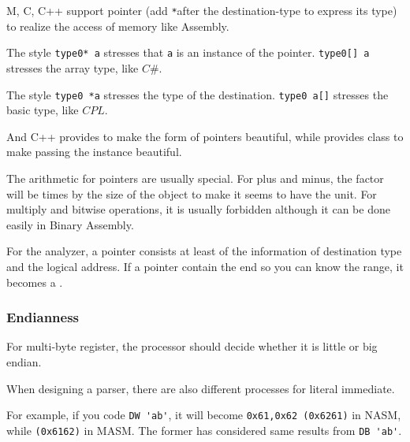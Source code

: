 M, C, C++ support pointer (add \verb`*`after the destination-type to express its type) to realize the access of memory like Assembly.

The style \verb|type0* a| stresses that \verb|a| is an instance of the pointer. \verb|type0[] a| stresses the array type, like $C\#$.

The style \verb|type0 *a| stresses the type of the destination. \verb|type0 a[]| stresses the basic type, like $CPL$.

And C++ provides  to make the form of pointers beautiful, while provides class to make passing the instance beautiful.

The arithmetic for pointers are usually special. For plus and minus, the factor will be times by the size of the object to make it seems to have the unit. For multiply and bitwise operations, it is usually forbidden although it can be done easily in Binary Assembly. 

For the analyzer, a pointer consists at least of the information of destination type and the logical address.
If a pointer contain the end so you can know the range, it becomes a .

\subsubsection{Endianness}

For multi-byte register, the processor should decide whether it is little or big endian.

When designing a parser, there are also different processes for literal immediate.

For example, if you code \verb|DW 'ab'|, it will become \verb"0x61,0x62 (0x6261)" in NASM, while \verb"(0x6162)" in MASM. The former has considered same results from \verb|DB 'ab'|. %



